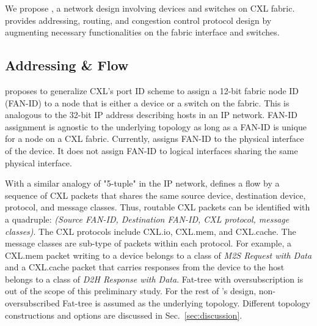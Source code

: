 We propose \aurelia, a network design involving devices and switches on CXL fabric. \aurelia provides addressing, routing, and congestion control protocol design by augmenting necessary functionalities on the fabric interface and switches.

\subsection{Addressing \& Flow}
%
\aurelia proposes to generalize CXL's port ID scheme to assign a 12-bit fabric node ID (FAN-ID) to a node that is either a device or a switch on the fabric. 
%
This is analogous to the 32-bit IP address describing hosts in an IP network.
%
%
FAN-ID assignment is agnostic to the underlying topology as long as a FAN-ID is unique for a node on a CXL fabric. 
%
Currently, \aurelia assigns FAN-ID to the physical interface of the device. It does not assign FAN-ID to logical interfaces sharing the same physical interface.
%


With a similar analogy of "5-tuple" in the IP network, \aurelia defines a flow by a sequence of CXL packets that shares the same source device, destination device, protocol, and message classes.
%
Thus, routable CXL packets can be identified with a quadruple: \emph{(Source FAN-ID, Destination FAN-ID, CXL protocol, message classes)}. The CXL protocols include CXL.io, CXL.mem, and CXL.cache. The message classes are sub-type of packets within each protocol. For example, a CXL.mem packet writing to a device belongs to a class of \emph{M2S Request with Data} and a CXL.cache packet that carries responses from the device to the host belongs to a class of \emph{D2H Response with Data}.
%
Fat-tree with oversubscription is out of the scope of this preliminary study. 
%
For the rest of \aurelia's design, non-oversubscribed Fat-tree is assumed as the underlying topology. Different topology constructions and options are discussed in Sec.~\ref{sec:discussion}.
%



